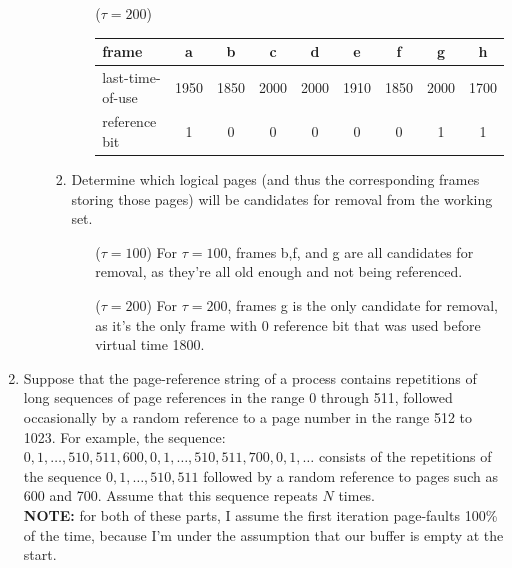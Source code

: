 \documentclass[11pt]{article}
\newcommand{\n}{\vspace{0.3cm}}
\begin{document}
\begin{enumerate}
\begin{enumerate}
\begin{enumerate}
\begin{enumerate}
              \item[(\(\tau = 200\))]
                \begin{center}
                  \begin{tabular}[c]{|l|c|c|c|c|c|c|c|c|}
                    \hline
                    frame & a & b & c & d & e & f & g & h \\
                    \hline
                    last-time-of-use & 1950 & 1850 & 2000 & 2000 & 1910 & 1850 & 2000 & 1700 \\
                    \hline
                    reference bit & 1 & 0 & 0 & 0 & 0 & 0 & 1 & 1 \\
                    \hline
                  \end{tabular} \n
                \end{center}
            \end{enumerate} \n

          \item Determine which logical pages (and thus the corresponding frames storing those pages) will be candidates for removal from the working set. \n

            \begin{enumerate}
              \item[(\(\tau = 100\))] For \(\tau = 100\), frames b,f, and g are all candidates for removal, as they're all old enough and not being referenced. \n

              \item[(\(\tau = 200\))] For \(\tau = 200\), frames g is the only candidate for removal, as it's the only frame with 0 reference bit that was used before virtual time 1800.
            \end{enumerate}
        \end{enumerate}
    \end{enumerate} \n
    
  \item Suppose that the page-reference string of a process contains repetitions of long sequences of page references in the range 0 through 511, followed occasionally by a random reference to a page number in the range 512 to 1023.  For example, the sequence: \(0, 1, \hdots, 510, 511, 600, 0, 1, \hdots, 510, 511, 700, 0, 1, \hdots\) consists of the repetitions of the sequence \(0, 1, \hdots, 510, 511\) followed by a random reference to pages such as 600 and 700. Assume that this sequence repeats \(N\) times. \n\\
    \textbf{NOTE:} for both of these parts, I assume the first iteration page-faults 100\% of the time, because I'm under the assumption that our buffer is empty at the start.


\end{enumerate}
\end{document}
